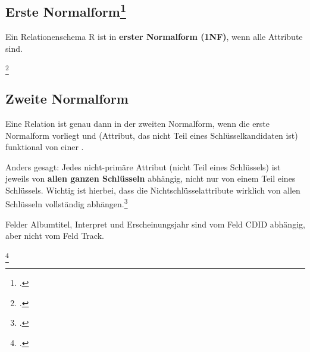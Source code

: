 \documentclass{bschlangaul-haupt}
\begin{document}
\subsection{Erste Normalform\footcite[Seite 195]{winter}}

Ein Relationenschema R ist in \textbf{erster Normalform (1NF)}, wenn
alle Attribute  sind.




\footcite{wiki:normalisierung}

%

\subsection{Zweite Normalform}

Eine Relation ist genau dann in der zweiten Normalform, wenn die erste
Normalform vorliegt und  (Attribut, das
nicht Teil eines Schlüsselkandidaten ist) funktional von einer
.

Anders gesagt: Jedes nicht-primäre Attribut (nicht Teil eines
Schlüssels) ist jeweils von \textbf{allen ganzen Schlüsseln} abhängig,
nicht nur von einem Teil eines Schlüssels. Wichtig ist hierbei, dass die
Nichtschlüsselattribute wirklich von allen Schlüsseln vollständig
abhängen.\footcite[Zweite Normalform (2NF)]{wiki:normalisierung}



Felder Albumtitel, Interpret und Erscheinungsjahr sind vom Feld CDID
abhängig, aber nicht vom Feld Track.



\footcite{wiki:normalisierung}

%
\end{document}
